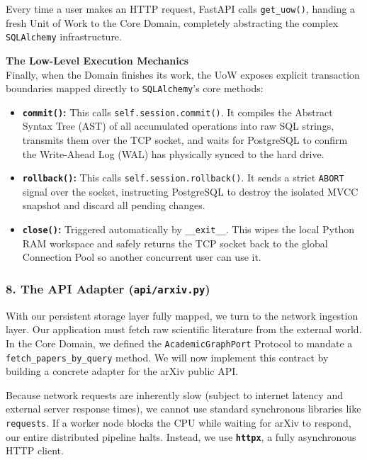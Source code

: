 Every time a user makes an HTTP request, FastAPI calls \texttt{get\_uow()}, handing a fresh Unit of Work to the Core Domain, completely abstracting the complex \texttt{SQLAlchemy} infrastructure.

\textbf{The Low-Level Execution Mechanics} \\
Finally, when the Domain finishes its work, the UoW exposes explicit transaction boundaries mapped directly to \texttt{SQLAlchemy}'s core methods:
\begin{itemize}
    \item \textbf{\texttt{commit()}:} This calls \texttt{self.session.commit()}. It compiles the Abstract Syntax Tree (AST) of all accumulated operations into raw SQL strings, transmits them over the TCP socket, and waits for PostgreSQL to confirm the Write-Ahead Log (WAL) has physically synced to the hard drive.
    \item \textbf{\texttt{rollback()}:} This calls \texttt{self.session.rollback()}. It sends a strict \texttt{ABORT} signal over the socket, instructing PostgreSQL to destroy the isolated MVCC snapshot and discard all pending changes.
    \item \textbf{\texttt{close()}:} Triggered automatically by \texttt{\_\_exit\_\_}. This wipes the local Python RAM workspace and safely returns the TCP socket back to the global Connection Pool so another concurrent user can use it.
\end{itemize}




\subsubsection*{8. The API Adapter (\texttt{api/arxiv.py})}

With our persistent storage layer fully mapped, we turn to the network ingestion layer. Our application must fetch raw scientific literature from the external world. In the Core Domain, we defined the \texttt{AcademicGraphPort} Protocol to mandate a \texttt{fetch\_papers\_by\_query} method. We will now implement this contract by building a concrete adapter for the arXiv public API.

Because network requests are inherently slow (subject to internet latency and external server response times), we cannot use standard synchronous libraries like \texttt{requests}. If a worker node blocks the CPU while waiting for arXiv to respond, our entire distributed pipeline halts. Instead, we use \textbf{\texttt{httpx}}, a fully asynchronous HTTP client.

